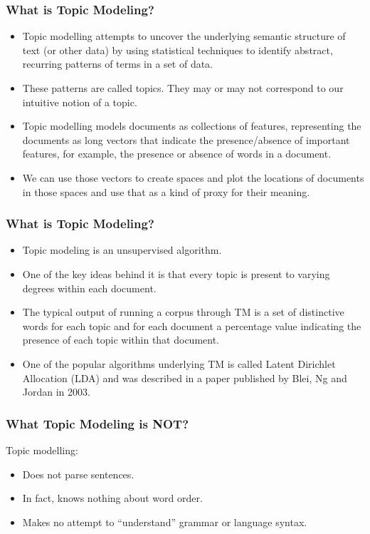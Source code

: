 \begin{frame}[fragile]\frametitle{What is Topic Modeling?}
  \begin{itemize}
  	\item Topic modelling attempts to uncover the underlying semantic structure of text (or other data) by using statistical techniques to identify abstract, recurring patterns of terms in a set of data. 
  	\item These patterns are called topics. They may or may not correspond to our intuitive notion of a topic. 
	\item Topic modelling models documents as collections of features, representing the documents as long vectors that indicate the presence/absence of important features, for example, the presence or absence of words in a document. 
	\item We can use those vectors to create spaces and plot the locations of documents in those spaces and use that as a kind of proxy for their meaning.
  \end{itemize}
\end{frame}

\begin{frame}[fragile]\frametitle{What is Topic Modeling?}
  \begin{itemize}
  	\item Topic modeling is an unsupervised algorithm.
  	\item One of the key ideas behind it is that every topic is present to
varying degrees within each document. 
\item The typical output of running a corpus
through TM is a set of distinctive words for each topic and for each document
a percentage value indicating the presence of each topic within that document.
  	\item One of the popular algorithms underlying TM is called Latent Dirichlet Allocation (LDA) and
was described in a paper published by Blei, Ng and Jordan in 2003. 
  \end{itemize}
\end{frame}

\begin{frame}[fragile]\frametitle{What Topic Modeling is NOT?}
Topic modelling: 
  \begin{itemize}
  	\item Does not parse sentences. 
  	\item In fact, knows nothing about word order. 
  	\item Makes no attempt to ``understand'' grammar or language syntax. 
  \end{itemize}
\end{frame}

